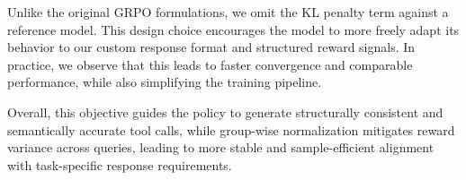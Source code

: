 Unlike the original GRPO formulations, we omit the KL penalty term against a reference model. This design choice encourages the model to more freely adapt its behavior to our custom response format and structured reward signals. In practice, we observe that this leads to faster convergence and comparable performance, while also simplifying the training pipeline.

Overall, this objective guides the policy to generate structurally consistent and semantically accurate tool calls, while group-wise normalization mitigates reward variance across queries, leading to more stable and sample-efficient alignment with task-specific response requirements.

